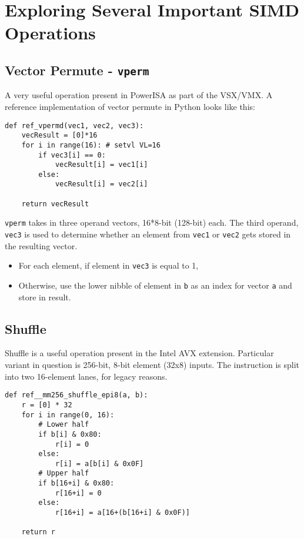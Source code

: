 %
\section{Exploring Several Important SIMD Operations}
\subsection{Vector Permute - \texttt{vperm}}

A very useful operation present in PowerISA as part of the VSX/VMX.
A reference implementation of vector permute in Python looks like this:

\begin{verbatim}
def ref_vpermd(vec1, vec2, vec3):
    vecResult = [0]*16
    for i in range(16): # setvl VL=16
        if vec3[i] == 0:
            vecResult[i] = vec1[i]
        else:
            vecResult[i] = vec2[i]

    return vecResult
\end{verbatim}

\texttt{vperm} takes in three operand vectors, 16*8-bit (128-bit) each.
The third operand, \texttt{vec3} is used to determine whether an element from
\texttt{vec1} or \texttt{vec2} gets stored in the resulting vector.

\begin{itemize}
  \item For each element, if element in \texttt{vec3} is equal to 1,
  \item Otherwise, use the lower nibble of element in \texttt{b} as an index
        for vector \texttt{a} and store in result.
\end{itemize}

\subsection{Shuffle}

Shuffle is a useful operation present in the Intel AVX extension.
Particular variant in question is 256-bit, 8-bit element (32x8) inputs.
The instruction is split into two 16-element lanes, for legacy reasons.

\begin{verbatim}
def ref__mm256_shuffle_epi8(a, b):
    r = [0] * 32
    for i in range(0, 16):
        # Lower half
        if b[i] & 0x80:
            r[i] = 0
        else:
            r[i] = a[b[i] & 0x0F]
        # Upper half
        if b[16+i] & 0x80:
            r[16+i] = 0
        else:
            r[16+i] = a[16+(b[16+i] & 0x0F)]

    return r
\end{verbatim}

